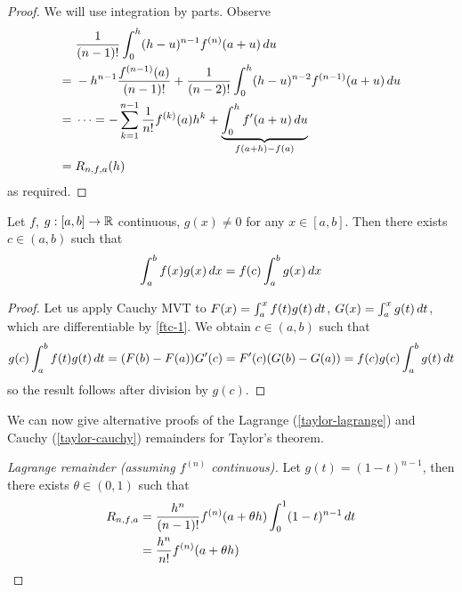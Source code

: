 \documentclass{../template/note}
\begin{document}
    \begin{proof}
        We will use integration by parts. Observe
        \begin{align*}
            &\; \frac{1}{(n-1)!} \int_0^h (h-u)^{n-1} f^{(n)}(a+u) \,d{u} \\
            =&\; -h^{n-1} \frac{f^{(n-1)}(a)}{(n-1)!} + \frac{1}{(n-2)!} \int_0^h (h-u)^{n-2} f^{(n-1)}(a+u) \,d{u} \\
            =&\; \dots = -\sum_{k=1}^{n-1} \frac 1 {n!} f^{(k)}(a) h^k + \underbrace{\int_0^h f'(a+u) \,d{u}}_{f(a+h)-f(a)} \\
            =&\; R_{n,f,a}(h)
        \end{align*}
        as required.        
    \end{proof}
    
    \begin{proposition}
        Let \(f\), \(g: [a, b] \to \mathbb R\) continuous, \(g(x) \neq 0\) for any \(x \in [a, b]\). Then there exists \(c \in (a, b)\) such that
        \begin{align*}
            \int_a^b f(x)g(x) \,d{x} = f(c) \int_a^b g(x) \,d{x}
        \end{align*}
    \end{proposition}
    
    \begin{proof}
        Let us apply Cauchy MVT to \(F(x) = \int_a^x f(t)g(t) \,d{t}\), \(G(x) = \int_a^x g(t) \,d{t}\), which are differentiable by \cref{ftc-1}. We obtain \(c \in (a, b)\) such that
        \begin{align*}
            g(c) \int_a^b f(t)g(t) \,d{t} = (F(b)-F(a))G'(c) = F'(c)(G(b)-G(a)) = f(c)g(c) \int_a^b g(t) \,d{t}
        \end{align*}
        so the result follows after division by \(g(c)\).        
    \end{proof}
    
    We can now give alternative proofs of the Lagrange (\cref{taylor-lagrange}) and Cauchy (\cref{taylor-cauchy}) remainders for Taylor's theorem.

    \begin{proof}[Lagrange remainder (\emph{assuming \(f^{(n)}\) continuous})]
        Let \(g(t) = (1-t)^{n-1}\), then there exists \(\theta \in (0, 1)\) such that
        \begin{align*}
            R_{n,f,a} &= \frac{h^n}{(n-1)!} f^{(n)}(a + \theta h) \int_0^1 (1-t)^{n-1} \,d{t} \\
            &= \frac{h^n}{n!} f^{(n)}(a+\theta h)
        \end{align*}
    \end{proof}
    
\end{document}
